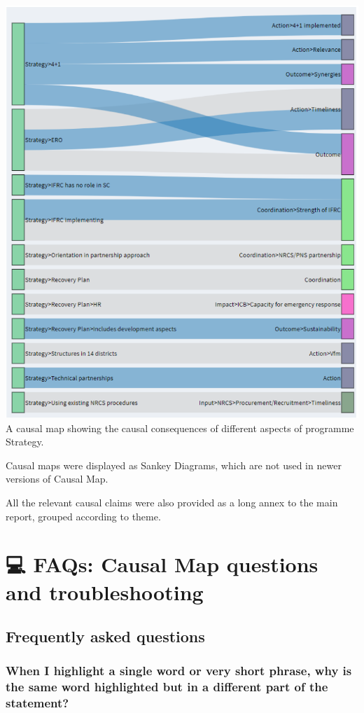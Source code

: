 \documentclass[
]{book}
\begin{document}
\includegraphics{_assets/19e34962dab6bd291d2b0de83a90478a.png}A causal map showing the causal consequences of different aspects of programme Strategy.

Causal maps were displayed as Sankey Diagrams, which are not used in newer versions of Causal Map.

All the relevant causal claims were also provided as a long annex to the main report, grouped according to theme.

\hypertarget{faqs-causal-map-questions-and-troubleshooting}{%
\chapter{💻 FAQs: Causal Map questions and troubleshooting}\label{faqs-causal-map-questions-and-troubleshooting}}

\hypertarget{frequently-asked-questions}{%
\section{Frequently asked questions}\label{frequently-asked-questions}}

\hypertarget{when-i-highlight-a-single-word-or-very-short-phrase-why-is-the-same-word-highlighted-but-in-a-different-part-of-the-statement}{%
\subsection{When I highlight a single word or very short phrase, why is the same word highlighted but in a different part of the statement?}\label{when-i-highlight-a-single-word-or-very-short-phrase-why-is-the-same-word-highlighted-but-in-a-different-part-of-the-statement}}
\end{document}
